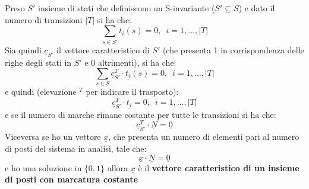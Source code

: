 \documentclass[a4paper,12pt, oneside]{book}
\begin{document}
\begin{definizione}
  Preso $S'$ insieme di stati che definiscono un S-invariante ($S'\subseteq S$)
  e dato il numero di transizioni $|T|$ si ha che:
  \[\sum_{s\in S'}t_i(s)=0,\,\,\,i=1,\ldots,|T|\]
  Sia quindi $\underline{c}_{S'}$ il vettore caratteristico di $S'$ (che
  presenta 1 in corrispondenza delle righe degli stati in $S'$ e 0 altrimenti),
  si ha che:
  \[\sum_{s\in S}\underline{c}_{S'}^T\cdot
    \underline{t_i}(s)=0,\,\,\,i=1,\ldots,|T|\] 
  e quindi (elevazione $^T$ per indicare il trasposto):
  \[\underline{c}_{S'}^T\cdot \underline{t_i}=0,\,\,\,i=1,\ldots,|T|\]
  e se il numero di marche rimane costante per tutte le transizioni si ha che:
  \[\underline{c}_{S'}^T\cdot \underline{N}=\underline{0}\]
  Viceversa se ho un vettore $\underline{x}$, che presenta un numero di elementi
  pari al numero di posti del sistema in analisi, tale che:
  \[\underline{x}\cdot \underline{N}=\underline{0}\]
  e ho una soluzione in $\{0,1\}$ allora $\underline{x}$ è il \textbf{vettore
    caratteristico di un insieme di posti con marcatura costante} 


\end{definizione}
\end{document}
